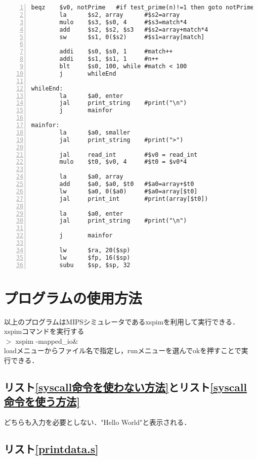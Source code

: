 \documentclass[11pt]{jarticle}
\begin{document}
\begin{lstlisting}[caption=100個の素数を配列に格納,label=100個の素数を配列に格納,numbers=left]
        beqz    $v0, notPrime   #if test_prime(n)!=1 then goto notPrime
        la      $s2, array      #$s2=array
        mulo    $s3, $s0, 4     #$s3=match*4
        add     $s2, $s2, $s3   #$s2=array+match*4
        sw      $s1, 0($s2)     #$s1=array[match]
        
        addi    $s0, $s0, 1     #match++
        addi    $s1, $s1, 1     #n++
        blt     $s0, 100, while #match < 100
        j       whileEnd    
        
whileEnd:
        la      $a0, enter      
        jal     print_string    #print("\n") 
        j       mainfor

mainfor:        
        la      $a0, smaller
        jal     print_string    #print(">")

        jal     read_int        #$v0 = read_int
        mulo    $t0, $v0, 4     #$t0 = $v0*4

        la      $a0, array
        add     $a0, $a0, $t0   #$a0=array+$t0
        lw      $a0, 0($a0)     #$a0=array[$t0]
        jal     print_int       #print(array[$t0])

        la      $a0, enter
        jal     print_string    #print("\n")

        j       mainfor

        lw      $ra, 20($sp)
        lw      $fp, 16($sp)
        subu    $sp, $sp, 32
\end{lstlisting}

\section{プログラムの使用方法}

以上のプログラムはMIPSシミュレータであるxspimを利用して実行できる．
xspimコマンドを実行する\\
$>$ xspim -mapped\_io\&\\

loadメニューからファイル名で指定し，runメニューを選んでokを押すことで実行できる．

\subsection{リスト\ref{syscall命令を使わない方法}とリスト\ref{syscall命令を使う方法}}

どちらも入力を必要としない．"Hello World"と表示される．

\subsection{リスト\ref{printdata.s}}
\end{document}

